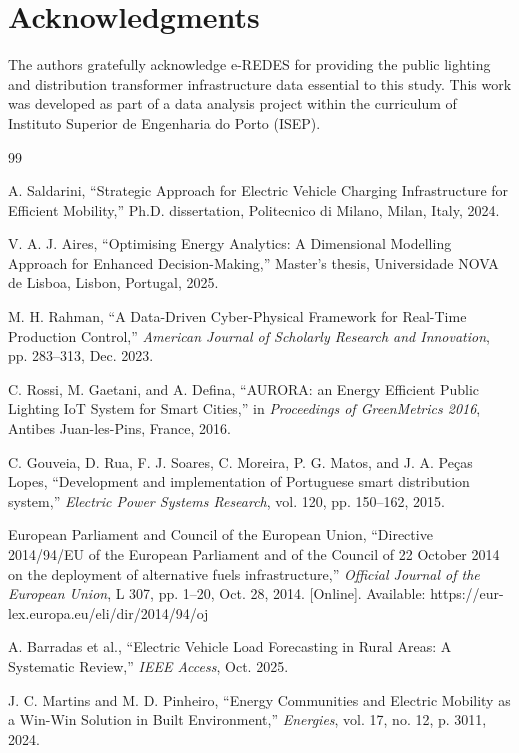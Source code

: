 \documentclass[conference]{IEEEtran}
\begin{document}
\section*{Acknowledgments}

The authors gratefully acknowledge e-REDES for providing the public lighting and distribution transformer infrastructure data essential to this study. This work was developed as part of a data analysis project within the curriculum of Instituto Superior de Engenharia do Porto (ISEP).

\begin{thebibliography}{99}

 A. Saldarini, ``Strategic Approach for Electric Vehicle Charging Infrastructure for Efficient Mobility,'' Ph.D. dissertation, Politecnico di Milano, Milan, Italy, 2024.

 V. A. J. Aires, ``Optimising Energy Analytics: A Dimensional Modelling Approach for Enhanced Decision-Making,'' Master's thesis, Universidade NOVA de Lisboa, Lisbon, Portugal, 2025.

 M. H. Rahman, ``A Data-Driven Cyber-Physical Framework for Real-Time Production Control,'' \textit{American Journal of Scholarly Research and Innovation}, pp. 283--313, Dec. 2023.

 C. Rossi, M. Gaetani, and A. Defina, ``AURORA: an Energy Efficient Public Lighting IoT System for Smart Cities,'' in \textit{Proceedings of GreenMetrics 2016}, Antibes Juan-les-Pins, France, 2016.

 C. Gouveia, D. Rua, F. J. Soares, C. Moreira, P. G. Matos, and J. A. Peças Lopes, ``Development and implementation of Portuguese smart distribution system,'' \textit{Electric Power Systems Research}, vol. 120, pp. 150--162, 2015.

 European Parliament and Council of the European Union, ``Directive 2014/94/EU of the European Parliament and of the Council of 22 October 2014 on the deployment of alternative fuels infrastructure,'' \textit{Official Journal of the European Union}, L 307, pp. 1--20, Oct. 28, 2014. [Online]. Available: https://eur-lex.europa.eu/eli/dir/2014/94/oj

 A. Barradas et al., ``Electric Vehicle Load Forecasting in Rural Areas: A Systematic Review,'' \textit{IEEE Access}, Oct. 2025.

 J. C. Martins and M. D. Pinheiro, ``Energy Communities and Electric Mobility as a Win-Win Solution in Built Environment,'' \textit{Energies}, vol. 17, no. 12, p. 3011, 2024.


\end{thebibliography}
\end{document}
